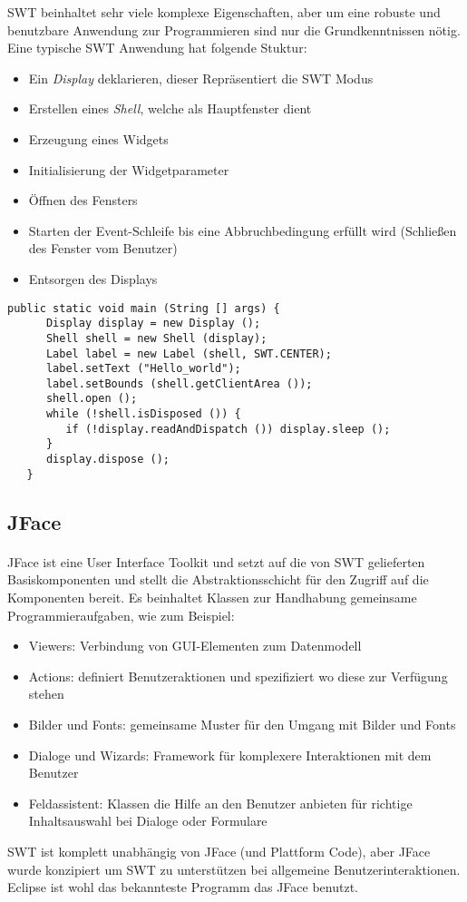 SWT beinhaltet sehr viele komplexe Eigenschaften, aber um eine robuste und benutzbare Anwendung zur Programmieren sind nur die Grundkenntnissen nötig. Eine typische SWT Anwendung hat folgende Stuktur:

\begin{itemize}
\item Ein \textit{Display} deklarieren, dieser Repräsentiert die SWT Modus
\item Erstellen eines \textit{Shell}, welche als Hauptfenster dient
\item Erzeugung eines Widgets
\item Initialisierung der Widgetparameter
\item Öffnen des Fensters
\item Starten der Event-Schleife bis eine Abbruchbedingung erfüllt wird (Schließen des Fenster vom Benutzer)
\item Entsorgen des Displays
\end{itemize}

\begin{lstlisting}[caption={Beispiel einer SWT Anwendung}, captionpos=b]
   public static void main (String [] args) {
      Display display = new Display ();
      Shell shell = new Shell (display);
      Label label = new Label (shell, SWT.CENTER);
      label.setText ("Hello_world");
      label.setBounds (shell.getClientArea ());
      shell.open ();
      while (!shell.isDisposed ()) {
         if (!display.readAndDispatch ()) display.sleep ();
      }
      display.dispose ();
   }
\end{lstlisting}

\subsection{JFace}
\paragraph{}
JFace ist eine User Interface Toolkit und setzt auf die von SWT gelieferten Basiskomponenten und stellt die Abstraktionsschicht für den Zugriff auf die Komponenten bereit. Es beinhaltet Klassen zur Handhabung gemeinsame Programmieraufgaben, wie zum Beispiel:
\begin{itemize}
\item Viewers: Verbindung von GUI-Elementen zum Datenmodell
\item Actions: definiert Benutzeraktionen und spezifiziert wo diese zur Verfügung stehen
\item Bilder und Fonts: gemeinsame Muster für den Umgang mit Bilder und Fonts
\item Dialoge und Wizards: Framework für komplexere Interaktionen mit dem Benutzer
\item Feldassistent: Klassen die Hilfe an den Benutzer anbieten für richtige Inhaltsauswahl bei Dialoge oder Formulare
\end{itemize}

SWT ist komplett unabhängig von JFace (und Plattform Code), aber JFace wurde konzipiert um SWT zu unterstützen bei allgemeine Benutzerinteraktionen. Eclipse ist wohl das bekannteste Programm das JFace benutzt.\cite{EclipseHelp}